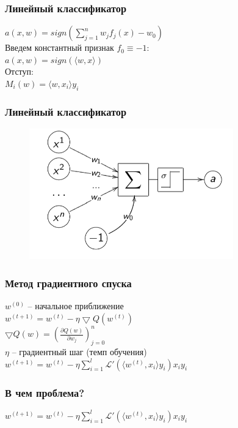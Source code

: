 \documentclass[12pt]{beamer}
\begin{document}
\begin{frame}\frametitle{Линейный классификатор}
$a(x, w) = sign(\sum\limits_{j=1}^n w_jf_j(x) - w_0)$\\
\vspace{3mm}
Введем константный признак $f_0 \equiv -1$:\\
\vspace{3mm}
$a(x, w) = sign(\langle w, x\rangle)$\\
\vspace{3mm}
Отступ:\\
$M_i(w) = \langle w, x_i\rangle y_i$
\end{frame}


\begin{frame}\frametitle{Линейный классификатор}
\begin{figure}[htbp]
  \includegraphics[height=160pt, keepaspectratio = true]{images/neuron}   
\end{figure}
\end{frame}

\begin{frame}\frametitle{Метод градиентного спуска}
$w^{(0)} $ -- начальное приближение\\
\vspace{3mm}
$w^{(t+1)} =  w^{(t)} - \eta \bigtriangledown Q(w^{(t)})$\\
\vspace{3mm}
$\bigtriangledown Q(w) = (\frac{\partial Q(w)}{\partial w_j})_{j=0}^n$\\
\vspace{3mm}
$\eta$ -- градиентный шаг (темп обучения)\\
\vspace{3mm}
$w^{(t+1)} =  w^{(t)} - \eta \sum\limits_{i=1}^l \mathcal{L}'(\langle w^{(t)}, x_i\rangle y_i)x_iy_i$\\
\end{frame}

\begin{frame}\frametitle{В чем проблема?}
$w^{(t+1)} =  w^{(t)} - \eta \sum\limits_{i=1}^l \mathcal{L}'(\langle w^{(t)}, x_i\rangle y_i)x_iy_i$\\
\end{frame}
\end{document}
